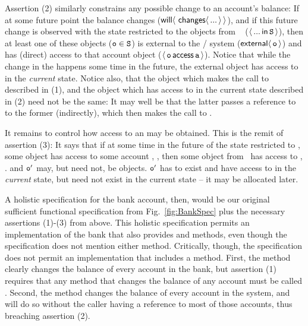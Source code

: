 Assertion (2) similarly constrains any possible change to an 
account's balance: 
If at some future point the balance changes  (${{\mathsf{will}}\langle \,\,{\mathsf{changes}}\langle\,...\,\rangle\,\rangle}$),  %
and if this future change is observed with the state restricted to the objects from \SF~ (\ie $\langle\, ...\, \mathsf{in}\, {\mbox{\tt{S}}}\, \rangle$), then 
at least one of these objects (${\mbox{\tt{o}}}\in{{\mbox{\tt{S}}}}$) is external to the / system (${\mathsf{external}}\langle\, {\mbox{\tt{o}}}\, \rangle$) and 
has (direct) access to that account object
($\langle\, {\mbox{\tt{o}}}\, \mathsf{access}\, {\mbox{\tt{a}}}\, \rangle$).
Notice that while the change in the  happens some time in the future,
the external object  has access to  in the \emph{current} state.
Notice also, that the object which makes the call to  described in (1), and the object which 
has access to  in the current state described in (2) need not be the same: It may well be that the
latter passes  a reference to  to the former (indirectly), which then makes the call
to .

It remains to control how access to an  may be obtained. This is the remit of assertion (3): 
It says that if at some time in the future of the state restricted to \SF, 
some  object   has access to some account  ,
,
  then some object 
from \SF~has access to , . 
  and   ${\mbox{\tt{o}}}'$ may, but need not, be  objects.  %
 ${\mbox{\tt{o}}}'$ has to exist and have access to  in the \emph{current} state, but 
 need not exist in the current state -- it may be allocated later.

\vspace{.1cm}

A  holistic  specification for the bank account, then,
would be our original sufficient functional specification from
Fig.~\ref{fig:BankSpec} plus the necessary
assertions (1)-(3) from above. %
This holistic specification
permits an implementation of the bank that also provides  
and  methods, even though the specification does not mention either method.
Critically, though, the \Chainmail specification
does not permit an
implementation that includes a  method.
First, the  method clearly changes the balance of
every account in the bank, but assertion (1) requires that any method
that changes the balance of any account must be called .
Second, the  method changes the balance of every account in
the system, and will do so without the caller having a reference to
most of those accounts, thus breaching assertion (2).   
 
